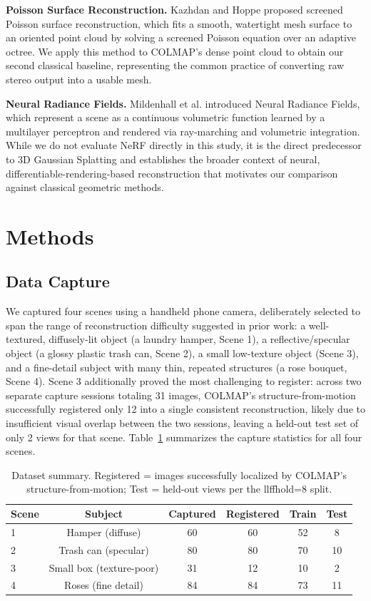 \documentclass[conference]{IEEEtran}
\begin{document}
\textbf{Poisson Surface Reconstruction.} Kazhdan and Hoppe \cite{kazhdan2013screened} proposed screened Poisson surface reconstruction, which fits a smooth, watertight mesh surface to an oriented point cloud by solving a screened Poisson equation over an adaptive octree. We apply this method to COLMAP's dense point cloud to obtain our second classical baseline, representing the common practice of converting raw stereo output into a usable mesh.

\textbf{Neural Radiance Fields.} Mildenhall et al. \cite{mildenhall2020nerf} introduced Neural Radiance Fields, which represent a scene as a continuous volumetric function learned by a multilayer perceptron and rendered via ray-marching and volumetric integration. While we do not evaluate NeRF directly in this study, it is the direct predecessor to 3D Gaussian Splatting and establishes the broader context of neural, differentiable-rendering-based reconstruction that motivates our comparison against classical geometric methods.

\section{Methods}

\subsection{Data Capture}
\label{sec:capture}
We captured four scenes using a handheld phone camera, deliberately selected to span the range of reconstruction difficulty suggested in prior work: a well-textured, diffusely-lit object (a laundry hamper, Scene 1), a reflective/specular object (a glossy plastic trash can, Scene 2), a small low-texture object (Scene 3), and a fine-detail subject with many thin, repeated structures (a rose bouquet, Scene 4). Scene 3 additionally proved the most challenging to register: across two separate capture sessions totaling 31 images, COLMAP's structure-from-motion successfully registered only 12 into a single consistent reconstruction, likely due to insufficient visual overlap between the two sessions, leaving a held-out test set of only 2 views for that scene. Table~\ref{tab:dataset} summarizes the capture statistics for all four scenes.

\begin{table}[htbp]
\centering
\caption{Dataset summary. Registered = images successfully localized by COLMAP's structure-from-motion; Test = held-out views per the llffhold=8 split.}
\label{tab:dataset}
\begin{tabular}{@{}lccccc@{}}
\toprule
Scene & Subject & Captured & Registered & Train & Test \\
\midrule
1 & Hamper (diffuse)   & 60 & 60 & 52 & 8  \\
2 & Trash can (specular) & 80 & 80 & 70 & 10 \\
3 & Small box (texture-poor) & 31 & 12 & 10 & 2  \\
4 & Roses (fine detail) & 84 & 84 & 73 & 11 \\
\bottomrule
\end{tabular}
\end{table}
\end{document}
